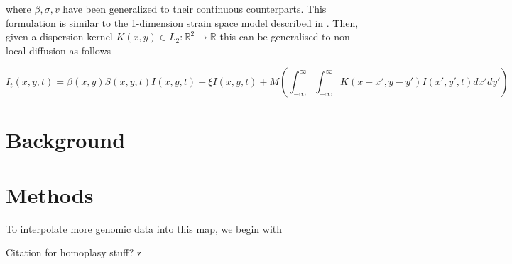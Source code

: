 \documentclass{article}
\begin{document}
where $\beta, \sigma, v$ have been generalized to their continuous counterparts. This formulation is similar to the 1-dimension strain space model described in \cite{Bessonov_Bocharov_Meyerhans_Popov_Volpert_2021}. Then, given a dispersion kernel $K(x,y) \in L_2: \mathbb{R}^2 \to \mathbb{R}$ this can be generalised to non-local diffusion as follows

\begin{equation}
    I_t(x,y,t) = \beta(x,y) S(x,y,t) I(x,y,t)- \xi I(x,y,t) + M \left(\int_{-\infty}^{\infty} \int_{-\infty}^{\infty} K(x-x',y-y')I(x',y',t) dx' dy' \right) \label{Ieqn_cts_nonlocal}    
\end{equation}


\maketitle

\section{Background}

\section{Methods}
To interpolate more genomic data into this map, we begin with 


Citation for homoplasy stuff?
z



\end{document}
